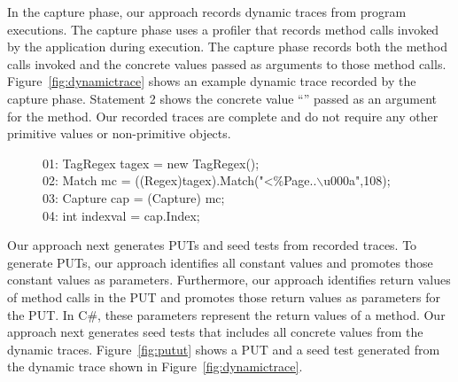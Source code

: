 In the capture phase, our approach records dynamic traces from program executions. The capture
phase uses a profiler that records method calls invoked by the application
during execution. The capture phase records both the method calls invoked and the concrete
values passed as arguments to those method calls. Figure~\ref{fig:dynamictrace} shows
an example dynamic trace recorded by the capture phase. Statement 2
shows the concrete value ``'' passed as an argument
for the  method. Our recorded traces are complete and do not 
require any other primitive values or non-primitive objects. 

\begin{figure}[t]
\begin{CodeOut}
01: TagRegex tagex = new TagRegex();\\
02: Match mc = ((Regex)tagex).Match("<\%\@ Page..$\backslash$u000a",108);\\
03: Capture cap = (Capture) mc;\\
04: int indexval = cap.Index;\\
\end{CodeOut}\vspace*{-3ex}
\vspace*{-1ex}
\end{figure}

Our approach next generates PUTs and seed tests from recorded traces. 
To generate PUTs, our approach identifies all constant values
and promotes those constant values as parameters. Furthermore, our approach identifies
return values of method calls in the PUT and
promotes those return values as  parameters for the PUT. 
In C\#, these  parameters represent the return values of a method.
Our approach next generates seed tests that includes all concrete values
from the dynamic traces. Figure~\ref{fig:putut} shows a PUT and a seed test
generated from the dynamic trace shown in Figure~\ref{fig:dynamictrace}.

